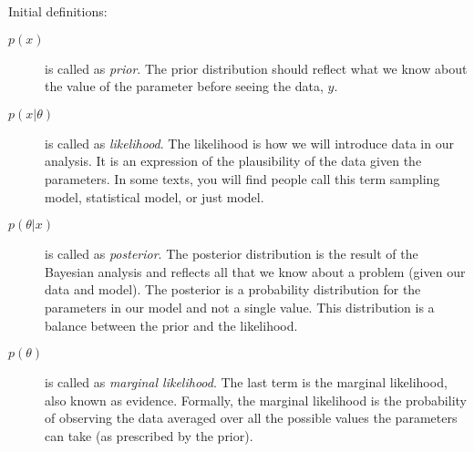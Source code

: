 Initial definitions:
\begin{description}
    \item[$p(x)$] is called as \emph{prior}. The prior distribution should reflect 
    what we know about the value of the parameter before seeing the data, $y$.

    \item[$p(x|\theta)$] is called as \emph{likelihood}. The likelihood is how 
    we will introduce data in our analysis. It is an expression of the 
    plausibility of the data given the parameters. In some texts, you will 
    find people call this term sampling model, statistical model, or just model.

    \item[$p(\theta|x)$] is called as \emph{posterior}. The posterior distribution 
    is the result of the Bayesian analysis and reflects all that we know about a 
    problem (given our data and model). The posterior is a probability distribution 
    for the parameters in our model and not a single value. This distribution is 
    a balance between the prior and the likelihood.

    \item[$p(\theta)$] is called as \emph{marginal likelihood}. The last term is 
    the marginal likelihood, also known as evidence. Formally, the marginal 
    likelihood is the probability of observing the data averaged over all the possible 
    values the parameters can take (as prescribed by the prior).
\end{description}


